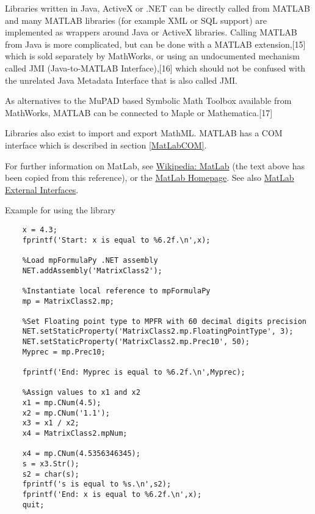 	\vpara
	Libraries written in Java, ActiveX or .NET can be directly called from MATLAB and many MATLAB libraries (for example XML or SQL support) are implemented as wrappers around Java or ActiveX libraries. Calling MATLAB from Java is more complicated, but can be done with a MATLAB extension,[15] which is sold separately by MathWorks, or using an undocumented mechanism called JMI (Java-to-MATLAB Interface),[16] which should not be confused with the unrelated Java Metadata Interface that is also called JMI.
	
	\vpara
	As alternatives to the MuPAD based Symbolic Math Toolbox available from MathWorks, MATLAB can be connected to Maple or Mathematica.[17]
	
	\vpara
	Libraries also exist to import and export MathML. MATLAB has a COM interface which is described in section \ref{MatLabCOM}.
	
	
	\vpara
	For further information on MatLab, see \href{http://en.wikipedia.org/wiki/MATLAB}{Wikipedia: MatLab} (the text above has been copied from this reference), or the  \href{http://www.mathworks.com/}{MatLab Homepage}. See also \href{http://www.mathworks.co.uk/help/matlab/external-interfaces.html}{MatLab External Interfaces}.	
	
	
	
	\newpage
	Example for using the library
	
	\begin{lstlisting}
	x = 4.3;
	fprintf('Start: x is equal to %6.2f.\n',x);
	
	%Load mpFormulaPy .NET assembly 
	NET.addAssembly('MatrixClass2');
	
	%Instantiate local reference to mpFormulaPy
	mp = MatrixClass2.mp;
	
	%Set Floating point type to MPFR with 60 decimal digits precision
	NET.setStaticProperty('MatrixClass2.mp.FloatingPointType', 3);
	NET.setStaticProperty('MatrixClass2.mp.Prec10', 50);
	Myprec = mp.Prec10;
	
	fprintf('End: Myprec is equal to %6.2f.\n',Myprec);
	
	%Assign values to x1 and x2
	x1 = mp.CNum(4.5);
	x2 = mp.CNum('1.1');
	x3 = x1 / x2;
	x4 = MatrixClass2.mpNum;
	
	x4 = mp.CNum(4.5356346345);
	s = x3.Str();
	s2 = char(s);
	fprintf('s is equal to %s.\n',s2);
	fprintf('End: x is equal to %6.2f.\n',x);
	quit;
	\end{lstlisting}
	
	



